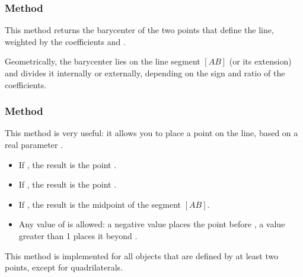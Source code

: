 \subsubsection{Method } %
\label{ssub:barycenter_with_a_line}

This method returns the barycenter of the two points that define the line, weighted by the coefficients  and .

\medskip

Geometrically, the barycenter lies on the line segment $[AB]$ (or its extension) and divides it internally or externally, depending on the sign and ratio of the coefficients.


\begin{tkzexample}[latex=.5\textwidth]
\begin{center}
\end{center}
\end{tkzexample}

\subsubsection{Method  }%
\label{ssub:method_point}

This method is very useful: it allows you to place a point on the line, based on a real parameter .

\begin{itemize}
  \item If , the result is the point .
  \item If , the result is the point .
  \item If , the result is the midpoint of the segment $[AB]$.
  \item Any value of  is allowed: a negative value places the point before , a value greater than 1 places it beyond .
\end{itemize}

This method is implemented for all objects that are defined by at least two points, except for quadrilaterals.


